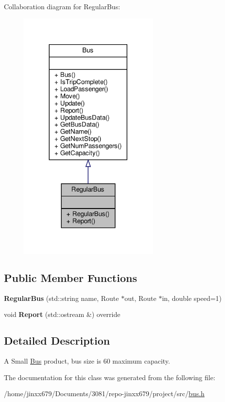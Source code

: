 Collaboration diagram for Regular\+Bus\+:\nopagebreak
\begin{figure}[H]
\begin{center}
\leavevmode
\includegraphics[width=200pt]{classRegularBus__coll__graph}
\end{center}
\end{figure}
\subsection*{Public Member Functions}
\begin{DoxyCompactItemize}
\item 
\mbox{\label{classRegularBus_aae4a0754bc23e8d3ac1f701172c4d8a0}} 
{\bfseries Regular\+Bus} (std\+::string name, Route $\ast$out, Route $\ast$in, double speed=1)
\item 
\mbox{\label{classRegularBus_a1c8e52afd8ba3cc1f6bf251e9cb10e5f}} 
void {\bfseries Report} (std\+::ostream \&) override
\end{DoxyCompactItemize}


\subsection{Detailed Description}
A Small \hyperlink{classBus}{Bus} product, bus size is 60 maximum capacity. 

The documentation for this class was generated from the following file\+:\begin{DoxyCompactItemize}
\item 
/home/jinxx679/\+Documents/3081/repo-\/jinxx679/project/src/\hyperlink{bus_8h}{bus.\+h}\end{DoxyCompactItemize}
